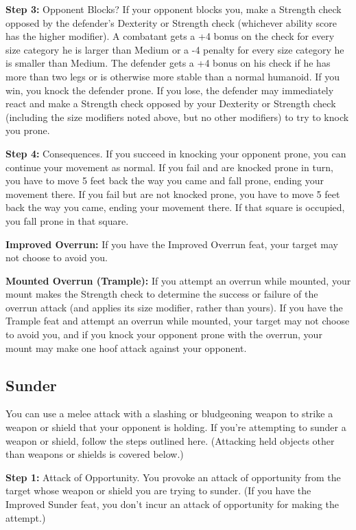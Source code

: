 \textbf{Step 3:} Opponent Blocks? If your opponent blocks you, make a Strength 
check opposed by the defender's Dexterity or Strength check (whichever ability 
score has the higher modifier). A combatant gets a +4 bonus on the check for every 
size category he is larger than Medium or a -4 penalty for every size category 
he is smaller than Medium. The defender gets a +4 bonus on his check if he has 
more than two legs or is otherwise more stable than a normal humanoid. If you win, 
you knock the defender prone. If you lose, the defender may immediately react and 
make a Strength check opposed by your Dexterity or Strength check (including the 
size modifiers noted above, but no other modifiers) to try to knock you prone.

\textbf{Step 4:} Consequences. If you succeed in knocking your opponent prone, 
you can continue your movement as normal. If you fail and are knocked prone in 
turn, you have to move 5 feet back the way you came and fall prone, ending your 
movement there. If you fail but are not knocked prone, you have to move 5 feet 
back the way you came, ending your movement there. If that square is occupied, 
you fall prone in that square.

\textbf{Improved Overrun:} If you have the Improved Overrun feat, your target may 
not choose to avoid you.

\textbf{Mounted Overrun (Trample):} If you attempt an overrun while mounted, your 
mount makes the Strength check to determine the success or failure of the overrun 
attack (and applies its size modifier, rather than yours). If you have the Trample 
feat and attempt an overrun while mounted, your target may not choose to avoid 
you, and if you knock your opponent prone with the overrun, your mount may make 
one hoof attack against your opponent.

\subsection{Sunder}

You can use a melee attack with a slashing or bludgeoning weapon to strike a weapon 
or shield that your opponent is holding. If you're attempting to sunder a weapon 
or shield, follow the steps outlined here. (Attacking held objects other than weapons 
or shields is covered below.)

\textbf{Step 1:} Attack of Opportunity. You provoke an attack of opportunity from 
the target whose weapon or shield you are trying to sunder. (If you have the Improved 
Sunder feat, you don't incur an attack of opportunity for making the attempt.)

